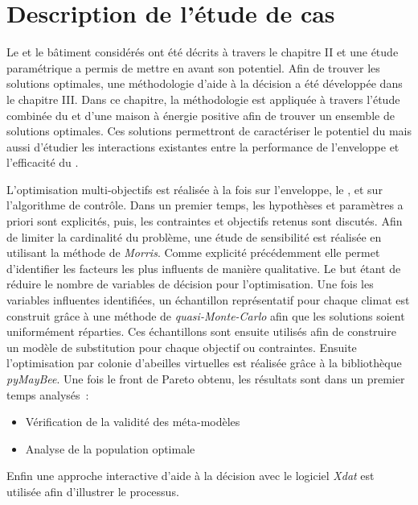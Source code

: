 

\section{Description de l’étude de cas} %
\label{sec:description_de_l_etude_de_cas}
Le  et le bâtiment considérés ont été décrits à travers le chapitre II et une étude
paramétrique a permis de mettre en avant son potentiel. Afin de trouver les solutions
optimales, une méthodologie d’aide à la décision a été développée dans le chapitre III.
Dans ce chapitre, la méthodologie est appliquée à travers l’étude combinée du 
et d’une maison à énergie positive afin de trouver un ensemble de solutions optimales.
Ces solutions permettront de caractériser le potentiel du  mais aussi d’étudier
les interactions existantes entre la performance de l’enveloppe et l’efficacité du .

L’optimisation multi-objectifs est réalisée à la fois sur l’enveloppe, le ,
et sur l’algorithme de contrôle. Dans un premier temps, les hypothèses
et paramètres a priori sont explicités, puis, les contraintes et objectifs retenus
sont discutés. Afin de limiter la
cardinalité du problème, une étude de sensibilité est réalisée en utilisant la méthode de
\textit{Morris}. Comme explicité précédemment elle permet d’identifier les facteurs les
plus influents de manière qualitative. Le but étant de réduire le nombre de variables de
décision pour l’optimisation. Une fois les variables influentes
identifiées, un échantillon représentatif pour chaque climat est construit grâce à une
méthode de \textit{quasi-Monte-Carlo} afin que les solutions soient uniformément réparties.
Ces échantillons sont ensuite utilisés afin de construire un modèle de substitution pour chaque objectif ou
contraintes. Ensuite l’optimisation par colonie d’abeilles virtuelles est réalisée
grâce à la bibliothèque \textit{pyMayBee}.
Une fois le front de Pareto obtenu, les résultats sont dans un premier temps analysés~:
\begin{itemize}
  \item Vérification de la validité des méta-modèles
  \item Analyse de la population optimale
\end{itemize}
Enfin une approche interactive d’aide à la décision avec le logiciel \textit{Xdat} est
utilisée afin d’illustrer le processus.



